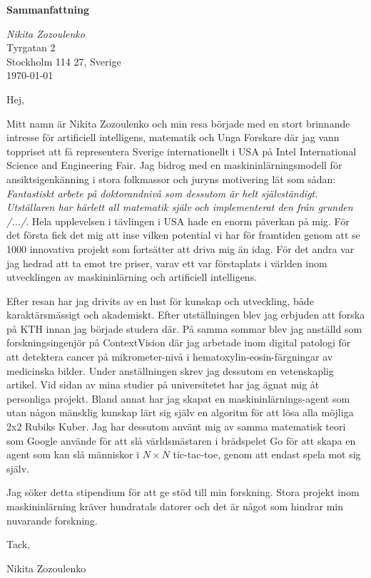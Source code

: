 \documentclass[11pt,a4paper]{article} %
\begin{document}
\begin{center}
\textbf{Sammanfattning}
\end{center}

\begin{flushright}
\textit{Nikita Zozoulenko} \\
Tyrgatan 2\\
Stockholm 114 27, Sverige \\
\today
\end{flushright}
Hej,

Mitt namn är Nikita Zozoulenko och min resa började med en stort brinnande intresse för artificiell intelligens, matematik och Unga Forskare där jag vann toppriset att få representera Sverige internationellt i USA på Intel International Science and Engineering Fair. Jag bidrog med en maskininlärningsmodell för ansiktsigenkänning i stora folkmassor och juryns motivering lät som sådan: \textit{Fantastiskt arbete på doktorandnivå som dessutom är helt självständigt. Utställaren har härlett all matematik själv och implementerat den från grunden /.../}. Hela upplevelsen i tävlingen i USA hade en enorm påverkan på mig. För det första fick det mig att inse vilken potential vi har för framtiden genom att se 1000 innovativa projekt som fortsätter att driva mig än idag. För det andra var jag hedrad att ta emot tre priser, varav ett var förstaplats i världen inom utvecklingen av maskininlärning och artificiell intelligens. 

Efter resan har jag drivits av en lust för kunskap och utveckling, både karaktärsmässigt och akademiskt. Efter utställningen blev jag erbjuden att forska på KTH innan jag började studera där. På samma sommar blev jag anställd som forskningsingenjör på ContextVision där jag arbetade inom digital patologi för att detektera cancer på mikrometer-nivå i hematoxylin-eosin-färgningar av medicinska bilder. Under anställningen skrev jag dessutom en vetenskaplig artikel. Vid sidan av mina studier på universitetet har jag ägnat mig åt personliga projekt. Bland annat har jag skapat en maskininlärnings-agent som utan någon mänsklig kunskap lärt sig själv en algoritm för att lösa alla möjliga 2x2 Rubiks Kuber.  Jag har dessutom använt mig av samma matematisk teori som Google använde för att slå världsmästaren i brädspelet Go för att skapa en agent som kan slå människor i $N \times N$ tic-tac-toe, genom att endast spela mot sig själv. 

Jag söker detta stipendium för att ge stöd till min forskning. Stora projekt inom maskininlärning kräver hundratals datorer och det är något som hindrar min nuvarande forskning.

Tack,

Nikita Zozoulenko


\end{document}
